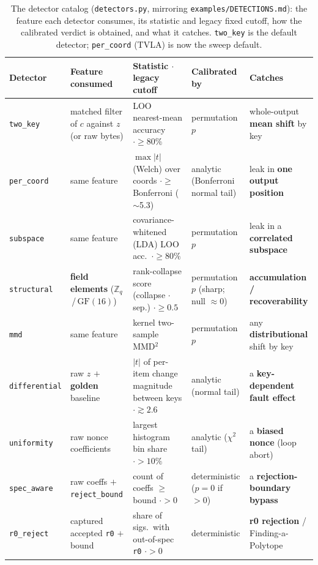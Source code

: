 \documentclass[11pt]{article}
\newcommand{\code}[1]{\texttt{#1}}
\newcommand{\Zq}{\ensuremath{\mathbb{Z}_q}}
\newcommand{\GF}[1]{\ensuremath{\mathrm{GF}(#1)}}
\begin{document}
\begin{table}[h]
\centering\footnotesize
\caption{The detector catalog (\code{detectors.py}, mirroring
\code{examples/DETECTIONS.md}): the feature each detector consumes, its statistic and
legacy fixed cutoff, how the calibrated verdict is obtained, and what it catches.
\code{two\_key} is the default detector; \code{per\_coord} (TVLA) is now the sweep default.}
\label{tab:detectors}
\begin{tabular}{@{}>{\raggedright\arraybackslash}p{2.1cm}>{\raggedright\arraybackslash}p{2.7cm}>{\raggedright\arraybackslash}p{3.0cm}>{\raggedright\arraybackslash}p{2.3cm}>{\raggedright\arraybackslash}p{2.8cm}@{}}
\toprule
Detector & Feature consumed & Statistic $\cdot$ legacy cutoff & Calibrated by & Catches \\
\midrule
\code{two\_key}   & matched filter of $c$ against $z$ (or raw bytes) & LOO nearest-mean accuracy $\cdot \geq 80\%$ & permutation $p$ & whole-output \textbf{mean shift} by key \\
\code{per\_coord} & same feature & $\max|t|$ (Welch) over coords $\cdot \geq$ Bonferroni ($\sim$5.3) & analytic (Bonferroni normal tail) & leak in \textbf{one output position} \\
\code{subspace}   & same feature & covariance-whitened (LDA) LOO acc.\ $\cdot \geq 80\%$ & permutation $p$ & leak in a \textbf{correlated subspace} \\
\code{structural} & \textbf{field elements} (\Zq\,/\,\GF{16}) & rank-collapse score (collapse $\cdot$ sep.) $\cdot \geq 0.5$ & permutation $p$ (sharp; null $\approx 0$) & \textbf{accumulation / recoverability} \\
\code{mmd}        & same feature & kernel two-sample MMD$^2$ & permutation $p$ & any \textbf{distributional} shift by key \\
\code{differential} & raw $z$ $+$ \textbf{golden} baseline & $|t|$ of per-item change magnitude between keys $\cdot \gtrsim 2.6$ & analytic (normal tail) & a \textbf{key-dependent fault effect} \\
\code{uniformity} & raw nonce coefficients & largest histogram bin share $\cdot > 10\%$ & analytic ($\chi^2$ tail) & a \textbf{biased nonce} (loop abort) \\
\code{spec\_aware}& raw coeffs $+$ \code{reject\_bound} & count of coeffs $\geq$ bound $\cdot > 0$ & deterministic ($p{=}0$ if ${>}0$) & a \textbf{rejection-boundary bypass} \\
\code{r0\_reject} & captured accepted \code{r0} $+$ bound & share of sigs.\ with out-of-spec \code{r0} $\cdot > 0$ & deterministic & \textbf{r0 rejection} / Finding-a-Polytope \\
\bottomrule
\end{tabular}
\end{table}
\end{document}
